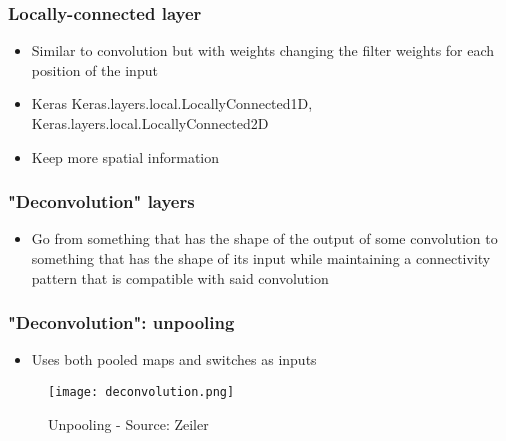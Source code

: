 \documentclass{beamer}
\begin{document}
\begin{frame}
	\frametitle{Locally-connected layer}
    \begin{itemize}
    \item Similar to convolution but with weights changing the filter weights for each position of the input
    \item Keras
        Keras.layers.local.LocallyConnected1D, Keras.layers.local.LocallyConnected2D
    \item Keep more spatial information
    \end{itemize}
\end{frame}

\begin{frame}
	\frametitle{"Deconvolution" layers}
    \begin{itemize}
    \item Go from something that has the shape of the output of some convolution to something that has the shape of its input while maintaining a connectivity pattern that is compatible with said convolution
    \end{itemize}    
\end{frame}

\begin{frame}
	\frametitle{"Deconvolution": unpooling}
    \begin{itemize}
    \item Uses both pooled maps and switches as inputs
    \end{itemize}
    \begin{figure}
		\texttt{[image: deconvolution.png]}
		\caption{Unpooling - Source: Zeiler}
	\end{figure}
\end{frame}
\end{document}
